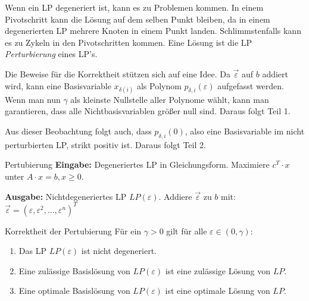 \documentclass{panikzettel}
\begin{document}
\begin{halfboxl}
Wenn ein LP degeneriert ist, kann es zu Problemen kommen.
In einem Pivotschritt kann die Lösung auf dem selben Punkt bleiben, da in einem degenerierten LP mehrere Knoten in einem Punkt landen.
Schlimmstenfalls kann es zu Zykeln in den Pivotschritten kommen.
Eine Lösung ist die LP \emph{Perturbierung} eines LP's.

Die Beweise für die Korrektheit stützen sich auf eine Idee.
Da $\vec{\varepsilon}$ auf $b$ addiert wird, kann eine Basisvariable $x_{\delta(i)}$ als Polynom $p_{\delta, i}(\varepsilon)$ aufgefasst werden.
Wenn man nun $\gamma$ als kleinste Nullstelle aller Polynome wählt, kann man garantieren, dass alle Nichtbasisvariablen größer null sind. Daraus folgt Teil 1.

Aus dieser Beobachtung folgt auch, dass $p_{\delta, i}(0)$, also eine Basisvariable im nicht perturbierten LP, strikt positiv ist. Daraus folgt Teil 2.

\end{halfboxl}%
\begin{halfboxr}
\vspace{-\baselineskip}
\begin{algo}{Pertubierung}
\textbf{Eingabe:} Degeneriertes LP in Gleichungsform.
\-\hspace{1em} Maximiere $c^T \cdot x$ unter $A \cdot x = b, x \geq 0$.

\textbf{Ausgabe:} Nichtdegeneriertes LP $LP(\varepsilon)$.
\tcblower
Addiere $\vec{\varepsilon}$ zu $b$ mit: \\
\-\hspace{1em} $\vec{\varepsilon} = (\varepsilon, \varepsilon^2, \dots, \varepsilon^n)^T$
\end{algo}

\begin{theo}{Korrektheit der Pertubierung}
Für ein $\gamma > 0$ gilt für alle $\varepsilon \in (0,\gamma)$:
\begin{enumerate}
    \item Das LP $LP(\varepsilon)$ ist nicht degeneriert.
    \item Eine zulässige Basislösung von $LP(\varepsilon)$ ist eine zulässige Lösung von $LP$.
    \item Eine optimale Basislösung von $LP(\varepsilon)$ ist eine optimale Lösung von $LP$.
\end{enumerate}
\end{theo}
\end{halfboxr}
\end{document}
